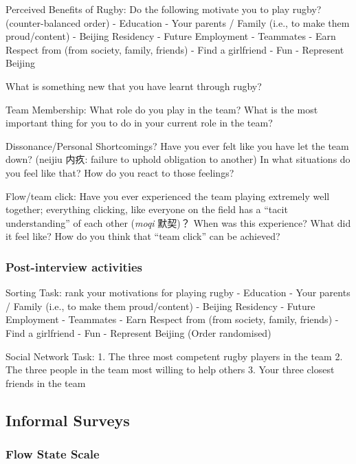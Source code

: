 \begin{CJK}{UTF8}{gbsn}
  Perceived Benefits of Rugby:
  Do the following motivate you to play rugby? (counter-balanced order)
  - Education
  - Your parents / Family (i.e., to make them proud/content)
  - Beijing Residency
  - Future Employment
  - Teammates
  - Earn Respect from (from society, family, friends)
  - Find a girlfriend
  - Fun
  - Represent Beijing

  What is something new that you have learnt through rugby?

  Team Membership:
  What role do you play in the team?
  What is the most important thing for you to do in your current role in the team?

  Dissonance/Personal Shortcomings?
  Have you ever felt like you have let the team down?  (neijiu 内疚: failure to uphold obligation to another)
  In what situations do you feel like that?
  How do you react to those feelings?

  Flow/team click:
  Have you ever experienced the team playing extremely well together; everything clicking, like everyone on the field has a “tacit understanding” of each other (\textit{moqi} 默契)？
  When was this experience?
  What did it feel like?
  How do you think that “team click” can be achieved?


  \subsubsection{Post-interview activities\label{sect:postInterview}}


  Sorting Task: rank your motivations for playing rugby
  - Education
  - Your parents / Family (i.e., to make them proud/content)
  - Beijing Residency
  - Future Employment
  - Teammates
  - Earn Respect from (from society, family, friends)
  - Find a girlfriend
  - Fun
  - Represent Beijing
  (Order randomised)

  Social Network Task:
  1.	The three most competent rugby players in the team
  2.	The three people in the team most willing to help others
  3.	Your three closest friends in the team



  \subsection{Informal Surveys}



        \subsubsection{Flow State Scale\label{sect:flowStateScale}}


\end{CJK}
